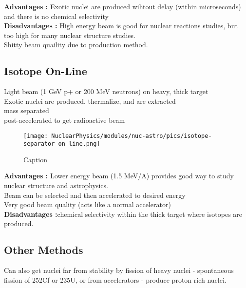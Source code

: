             \textbf{Advantages :} Exotic nuclei are produced wihtout delay (within microseconds) and there is no chemical selectivity\\
            \textbf{Disadvantages :} High energy beam is good for nuclear reactions studies, but too high for many nuclear structure studies.\\
            Shitty beam quaility due to production method.
            
            
        \subsection{Isotope On-Line}
            \indent Light beam (1 GeV p+ or 200 MeV neutrons) on heavy, thick target\\
            Exotic nuclei are produced, thermalize, and are extracted\\
            mass separated\\
            post-accelerated to get radioactive beam\\
            
            
                        
            \begin{figure}[H]
                \centering
                \texttt{[image: NuclearPhysics/modules/nuc-astro/pics/isotope-separator-on-line.png]}
            \caption{Caption}
            \end{figure}
         
            \textbf{Advantages :} Lower energy beam (1.5 MeV/A) provides good way to study nuclear structure and astrophysics. \\
            Beam can be selected and then accelerated to desired energy\\
            Very good beam quality (acts like a normal accelerator)\\
            \textbf{Disadvantages :}chemical selectivity within the thick target where isotopes are produced.
         
         
         \subsection{Other Methods}
            Can also get nuclei far from stability by fission of heavy nuclei - spontaneous fission of 252Cf or 235U, or from accelerators - produce proton rich nuclei. 
            
            
